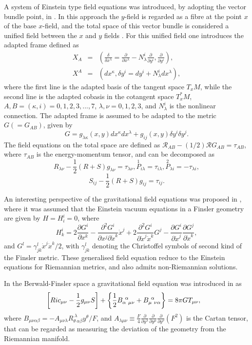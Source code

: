 \documentclass[aps,superscriptaddress, showpacs,preprintnumbers, superscriptaddress, nofootinbibt,twocolumn]{revtex4-2}
\def\be{\begin{equation}}
\def\ee{\end{equation}}
\def\bea{\begin{eqnarray}}
\def\eea{\end{eqnarray}}
\begin{document}
A system of Einstein type field equations was introduced, by adopting the vector bundle point, in \cite{Miron}. In this approach the $y$-field is regarded as a fibre at the point $x$ of the base $x$-field, and the total space of this vector bundle is considered a unified field between the $x$ and $y$ fields \cite{Ikeda}. For this unified field one introduces the adapted frame defined as
\bea
X_A&=&\left(\frac{\delta}{\delta x^{\lambda}}=\frac{\partial}{\partial x^{\lambda}}-N_{\lambda}^i\frac{\partial}{\partial y^i}, \frac{\partial}{\partial y^i}\right),\nonumber\\
X^A&=&\left(dx^{\kappa},\delta y^i=dy^i+N_{\lambda}^idx^{\lambda}\right),
\eea
where the first line is the adapted basis of the tangent
space $T_xM$, while the second line is the adapted cobasis in the cotangent
space $T_x^*M$, $A,B=\left(\kappa,i\right)=0,1,2,3,...,7$, $\lambda, \nu= 0,1,2,3$, and $N_{\lambda}^i$ is the nonlinear connection. The adapted frame is assumed to be adapted to the metric $G\left(=G_{AB}\right)$, given by
\be
G=g_{\lambda \kappa}(x,y)dx^{\kappa}dx^{\lambda}+g_{ij}(x,y)\delta y^i\delta y^j.
\ee
The field equations on the total space are defined as $\mathcal{R}_{AB}-(1/2)\mathcal{R}G_{AB}=\tau _{AB}$, where $\tau _{AB}$ is the energy-momentum tensor, and can be decomposed as
\be
R_{\lambda \nu}-\frac{1}{2}(R+S)g_{\lambda \nu}=\tau _{\lambda \nu}, \overset{1}{P}_{i \lambda}=\tau _{i\lambda},  \overset{2}{P}_{ \lambda i}=-\tau _{\lambda i},
\ee
\be
S_{i j}-\frac{1}{2}(R+S)g_{i j}=\tau _{ij}.
\ee

An interesting perspective of the gravitational field equations was proposed in \cite{Rutz}, where it was assumed that the Einstein vacuum equations in a Finsler geometry are given by $H=H_i^i=0$, where
\be
H_k^i=2\frac{\partial G^i}{\partial x^k}-\frac{\partial ^2G^i}{\partial x^j \partial \dot{x}^k}\dot{x}^j+2\frac{\partial ^2G^i}{\partial \dot{x}^j\dot{x}^k}G^j-\frac{\partial G^i}{\partial \dot{x}^j}\frac{\partial G^j}{\partial \dot{x}^k},
\ee
and $G^l=\gamma _{jk}^l\dot{x}^j\dot{x}^k/2$, with $\gamma _{jk}^l$ denoting the Christoffel symbols of second kind of the Finsler metric. These generalised field equation reduce to the Einstein equations for Riemannian metrics, and also admits non-Riemannian solutions.

In the Berwald-Finsler space a gravitational field equation was introduced in \cite{Lixin} as
\begin{eqnarray}
\hspace{-0.3cm}\left[Ric_{\mu\nu}-\frac{1}{2}g_{\mu\nu}S\right]+\left\{\frac{1}{2}
B^{~\alpha}_{\alpha~\mu\nu}+B^{~\alpha}_{\mu~\nu\alpha}\right\}=8\pi
G T_{\mu\nu} ,
\end{eqnarray}
where $B_{\mu\nu\alpha\beta}=-A_{\mu\nu\lambda}R^{~\lambda}_{\theta~\alpha\beta}y^\theta/F$, and $
A_{\lambda\mu\nu}\equiv\frac{F}{4}\frac{\partial}{\partial y^\lambda}\frac{\partial}{\partial y^\mu}\frac{\partial}{\partial y^\nu}(F^2)$ is the Cartan tensor, that can be regarded as measuring the deviation of the geometry from the Riemannian manifold.
\end{document}
